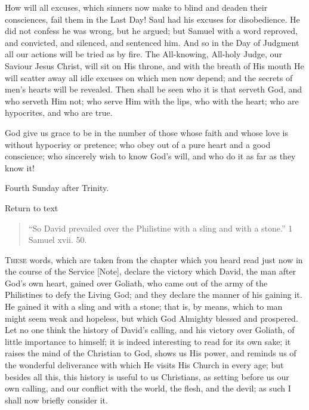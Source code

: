 How will all excuses, which sinners now make to blind and deaden
their consciences, fail them in the Last Day! Saul had his excuses for
disobedience. He did not confess he was wrong, but he argued; but
Samuel with a word reproved, and convicted, and silenced, and
sentenced him. And so in the Day of Judgment all our actions will be
tried as by fire. The All-knowing, All-holy Judge, our Saviour Jesus
Christ, will sit on His throne, and with the breath of His mouth He
will scatter away all idle excuses on which men now depend; and the
secrets of men's hearts will be revealed. Then shall be seen who it is
that serveth God, and who serveth Him not; who serve Him with the
lips, who with the heart; who are hypocrites, and who are true.

God give us grace to be in the number of those whose faith and
whose love is without hypocrisy or pretence; who obey out of a pure
heart and a good conscience; who sincerely wish to know God's will,
and who do it as far as they know it!


Fourth Sunday after Trinity.

Return to text


\begin{quote}

``So David prevailed over the Philistine with a sling and
with a stone.'' 1 Samuel xvii. 50.

\end{quote}

T\textsc{hese} words, which are taken from the chapter which you heard read
just now in the course of the Service [Note],
declare the victory which David, the man after God's own heart, gained
over Goliath, who came out of the army of the Philistines to defy the
Living God; and they declare the manner of his gaining it. He gained
it with a sling and with a stone; that is, by means, which to man
might seem weak and hopeless, but which God Almighty blessed and
prospered. Let no one think the history of David's calling, and his
victory over Goliath, of little importance to himself; it is indeed
interesting to read for its own sake; it raises the mind of the
Christian to God, shows us His power, and reminds us of the wonderful
deliverance with which He visits His Church in every age; but besides
all this, this history is useful to us Christians, as setting before
us our own calling, and our conflict with the world, the flesh, and
the devil; as such I shall now briefly consider it.


